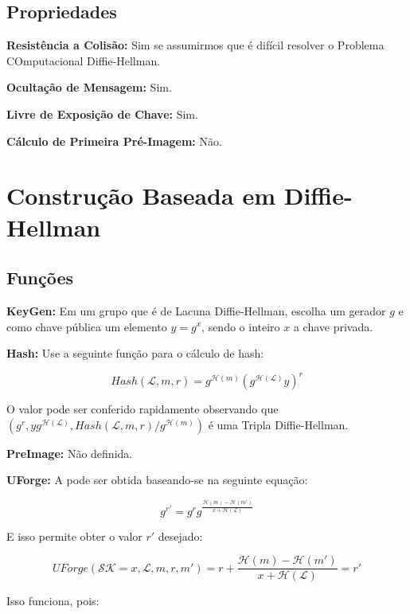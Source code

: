 \documentclass[a4paper]{article}
\begin{document}
\subsection{Propriedades}

\textbf{Resistência a Colisão: }Sim se assumirmos que é difícil resolver o Problema COmputacional Diffie-Hellman.

\textbf{Ocultação de Mensagem: }Sim.

\textbf{Livre de Exposição de Chave: } Sim.

\textbf{Cálculo de Primeira Pré-Imagem: }Não.

\section{Construção Baseada em Diffie-Hellman \cite{ateniese}}

\subsection{Funções}

\textbf{KeyGen: }Em um grupo que é de Lacuna Diffie-Hellman, escolha
um gerador $g$ e como chave pública um elemento $y=g^x$, sendo o
inteiro $x$ a chave privada.

\textbf{Hash: }Use a seguinte função para o cálculo de hash:

$$
Hash(\mathcal{L}, m, r) = g^{\mathcal{H}(m)}(g^{\mathcal{H}(\mathcal{L})}y)^r
$$

O valor pode ser conferido rapidamente observando que $(g^r,
yg^{\mathcal{H}(\mathcal{L})}, Hash(\mathcal{L}, m,
r)/g^{\mathcal{H}(m)})$ é uma Tripla Diffie-Hellman.

\textbf{PreImage:} Não definida.

\textbf{UForge:} A pode ser obtida baseando-se na seguinte equação:

$$
g^{r'}=g^rg^{\frac{\mathcal{H}(m)-\mathcal{H}(m')}{x+\mathcal{H}(\mathcal{L})}}
$$

E isso permite obter o valor $r'$ desejado:

$$
UForge(\mathcal{SK}=x, \mathcal{L}, m, r, m') = r + \frac{\mathcal{H}(m)-\mathcal{H}(m')}{x+\mathcal{H}(\mathcal{L})} = r'
$$

Isso funciona, pois:
\end{document}
